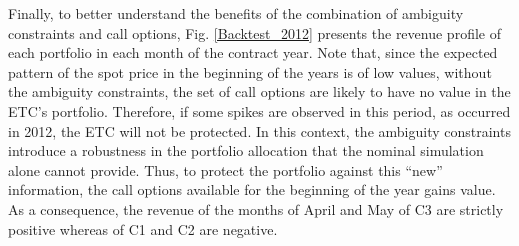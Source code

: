 	Finally, to better understand the benefits of the combination of ambiguity constraints and call options, Fig. \ref{Backtest_2012} presents the revenue profile of each portfolio in each month of the contract year. Note that, since the expected pattern of the spot price in the beginning of the years is of low values, without the ambiguity constraints, the set of call options are likely to have no value in the ETC's portfolio. Therefore, if some spikes are observed in this period, as occurred in 2012, the ETC will not be protected. In this context, the ambiguity constraints introduce a robustness in the portfolio allocation that the nominal simulation alone cannot provide. Thus, to protect the portfolio against this ``new'' information, the call options available for the beginning of the year gains value. As a consequence, the revenue of the months of April and May of C3 are strictly positive whereas of C1 and C2 are negative.